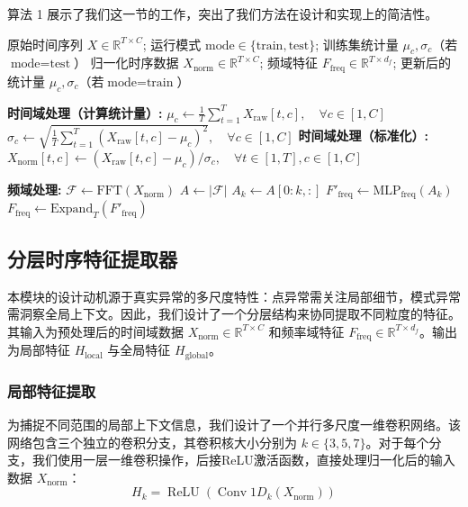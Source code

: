 \documentclass{setp-new}
\begin{document}
算法 1 展示了我们这一节的工作，突出了我们方法在设计和实现上的简洁性。
\begin{algorithm}[H]
\caption{时频双域预处理模块}
\label{alg:time_freq_preprocessing}
\begin{algorithmic}[1]
\Require 原始时间序列 $X \in \mathbb{R}^{T \times C}$; 运行模式 $\text{mode} \in \{\text{train}, \text{test}\}$; 训练集统计量 $\mu_c, \sigma_c$（若$\text{mode} = \text{test}$）
\Ensure 归一化时序数据 $X_{\text{norm}} \in \mathbb{R}^{T \times C}$; 频域特征 $F_{\text{freq}} \in \mathbb{R}^{T \times d_f}$; 更新后的统计量 $\mu_c, \sigma_c$（若$\text{mode} = \text{train}$）

    \State \textbf{时间域处理（计算统计量）:}
    \State $\mu_c \gets \frac{1}{T} \sum_{t=1}^{T} X_{\text{raw}}[t, c], \quad \forall c \in [1, C]$ 
    \State $\sigma_c \gets \sqrt{\frac{1}{T} \sum_{t=1}^{T} (X_{\text{raw}}[t, c] - \mu_c)^2}, \quad \forall c \in [1, C]$ 
\EndIf
\State \textbf{时间域处理（标准化）:}
\State $X_{\text{norm}}[t, c] \gets (X_{\text{raw}}[t, c] - \mu_c) / \sigma_c, \quad \forall t \in [1, T], c \in [1, C]$ 

\State \textbf{频域处理:}
\State $\mathcal{F} \gets \text{FFT}(X_{\text{norm}})$ 
\State $A \gets |\mathcal{F}|$ 
\State $A_k \gets A[0:k, :]$ 
\State $F'_{\text{freq}} \gets \text{MLP}_{\text{freq}}(A_k)$ 
\State $F_{\text{freq}} \gets \text{Expand}_T(F'_{\text{freq}})$ 
\end{algorithmic}
\end{algorithm}

\subsection{分层时序特征提取器}

本模块的设计动机源于真实异常的多尺度特性：点异常需关注局部细节，模式异常需洞察全局上下文。因此，我们设计了一个分层结构来协同提取不同粒度的特征。其输入为预处理后的时间域数据 $X_{\text{norm}} \in \mathbb{R}^{T \times C}$ 和频率域特征 $F_{\text{freq}} \in \mathbb{R}^{T \times d_f}$。输出为局部特征 $H_{\text{local}}$ 与全局特征 $H_{\text{global}}$。

\subsubsection{局部特征提取}
为捕捉不同范围的局部上下文信息，我们设计了一个并行多尺度一维卷积网络。该网络包含三个独立的卷积分支，其卷积核大小分别为 $k \in \{3, 5, 7\}$。对于每个分支，我们使用一层一维卷积操作，后接ReLU激活函数，直接处理归一化后的输入数据 $X_{\text{norm}}$：
\begin{equation}
H_k = \operatorname{ReLU}\left(\operatorname{Conv}1D_{k}\left(X_{\text{norm}}\right)\right)
\end{equation}
\end{document}
